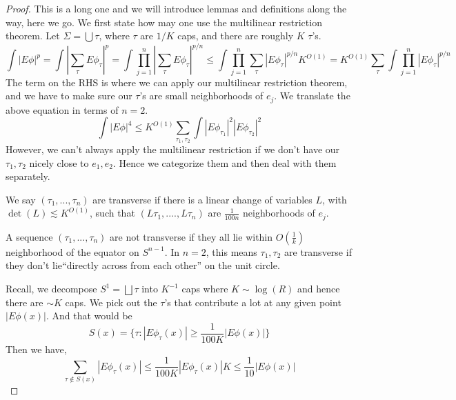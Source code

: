 \begin{proof}
    This is a long one and we will introduce lemmas and definitions along the way, here we go. We first state how may one use the multilinear restriction theorem. Let $\Sigma=\bigcup\tau$, where $\tau$ are $1/K$ caps, and there are roughly $K$ $\tau$'s.
    \begin{equation*}
        \int|E\phi|^p=\int|\sum_\tau E\phi_\tau|^p=\int\prod_{j=1}^n|\sum_\tau E\phi_\tau|^{p/n}\leq\int\prod_{j=1}^n\sum_\tau|E\phi_\tau|^{p/n}K^{O(1)}=K^{O(1)}\sum_\tau\int\prod_{j=1}^n|E\phi_\tau|^{p/n}
    \end{equation*}
    The term on the RHS is where we can apply our multilinear restriction theorem, and we have to make sure our $\tau$'s are small neighborhoods of $e_j$. We translate the above equation in terms of $n=2$. 
    \begin{equation*}
        \int|E\phi|^4\leq K^{O(1)}\sum_{\tau_1,\tau_2}\int|E\phi_{\tau_1}|^2|E\phi_{\tau_2}|^2
    \end{equation*}
    However, we can't always apply the multilinear restriction if we don't have our $\tau_1, \tau_2$ nicely close to $e_1, e_2$. Hence we categorize them and then deal with them separately.
    \begin{definition}
        We say $(\tau_1, ..., \tau_n)$ are transverse if there is a linear change of variables $L$, with $\det(L)\lesssim K^{O(1)}$, such that $(L\tau_1,...., L\tau_n)$ are $\frac{1}{100n}$ neighborhoods of $e_j$.
    \end{definition}
    \begin{remark}
        A sequence $(\tau_1, ..., \tau_n)$ are not transverse if they all lie within $O(\frac{1}{k})$ neighborhood of the equator on $S^{n-1}$. In $n=2$, this means $\tau_1, \tau_2$ are transverse if they don't lie``directly across from each other'' on the unit circle.   
    \end{remark}
    Recall, we decompose $S^1=\bigsqcup\tau$ into $K^{-1}$ caps where $K\sim\log(R)$ and hence there are $\sim K$ caps. We pick out the $\tau$'s that contribute a lot at any given point $|E\phi(x)|$. And that would be 
    \begin{equation*}
        S(x)=\{\tau:|E\phi_\tau(x)|\geq\frac{1}{100K}|E\phi(x)|\}
    \end{equation*}
    Then we have, 
    \begin{equation*}
        \sum_{\tau\not\in S(x)}|E\phi_\tau(x)|\leq\frac{1}{100K}|E\phi_\tau(x)|K\leq\frac{1}{10}|E\phi(x)|
    \end{equation*}

\end{proof}
